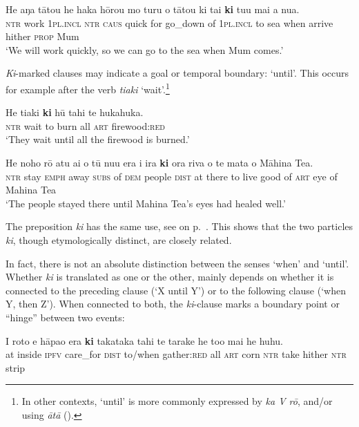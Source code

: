 \ea\label{ex:11.195}
\gll He aŋa tātou he haka hōrou mo turu o tātou ki tai  \textbf{ki} tu{\ꞌ}u mai a nua.\\
\textsc{ntr} work \textsc{1pl.incl} \textsc{ntr} \textsc{caus} quick for go\_down of \textsc{1pl.incl} to sea  when arrive hither \textsc{prop} Mum\\

\glt 
‘We will work quickly, so we can go to the sea when Mum comes.’ \textstyleExampleref{[R229.456]} 
\z

\textit{Ki}{}-marked clauses may indicate a goal or temporal boundary: ‘until’. This occurs for example after the verb \textit{tiaki} ‘wait’.\footnote{\label{fn:526}In other contexts, ‘until’ is more commonly expressed by \textit{ka V rō}, and/or using \textit{{\ꞌ}ātā} ().}

\ea\label{ex:11.196}
\gll He tiaki \textbf{ki} hū tahi te hukahuka. \\
\textsc{ntr} wait to burn all \textsc{art} firewood:\textsc{red} \\

\glt 
‘They wait until all the firewood is burned.’ \textstyleExampleref{[R333.460]} 
\z

\ea\label{ex:11.197}
\gll He noho rō atu {\ꞌ}ai o tū nu{\ꞌ}u era {\ꞌ}i ira \textbf{ki} ora riva o te mata o Māhina Tea.\\
\textsc{ntr} stay \textsc{emph} away \textsc{subs} of \textsc{dem} people \textsc{dist} at there to live good of \textsc{art} eye of Mahina Tea\\

\glt
‘The people stayed there until Mahina Tea’s eyes had healed well.’ \textstyleExampleref{[R399.235]} 
\z

The preposition \textit{ki} has the same use, see  on p.~\pageref{ex:4.266}. This shows that the two particles \textit{ki}, though etymologically distinct, are closely related.

In fact, there is not an absolute distinction between the senses ‘when’ and ‘until’. Whether \textit{ki} is translated as one or the other, mainly depends on whether it is connected to the preceding clause (‘X until Y’) or to the following clause (‘when Y, then Z’). When connected to both, the \textit{ki}{}-clause marks a boundary point or “hinge” between two events:

\ea\label{ex:11.198}
\gll {\ꞌ}I roto e hāpa{\ꞌ}o era \textbf{ki} takataka tahi te tarake  he to{\ꞌ}o mai he huhu.\\
at inside \textsc{ipfv} care\_for \textsc{dist} to/when gather:\textsc{red} all \textsc{art} corn  \textsc{ntr} take hither \textsc{ntr} strip\\

